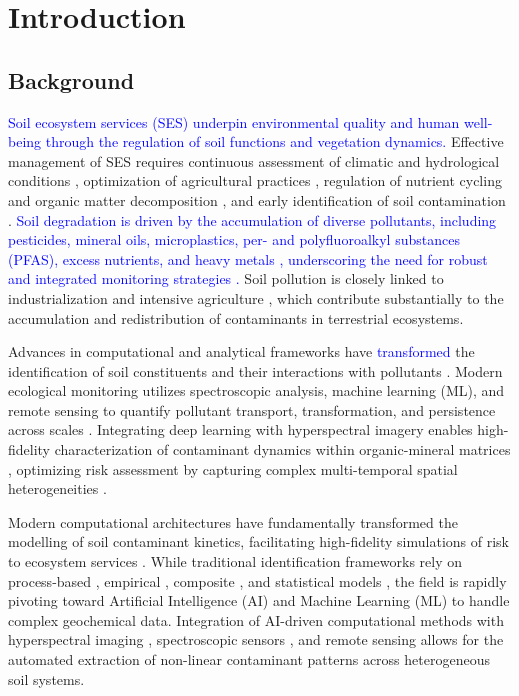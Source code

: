 \documentclass[environments,article,submit,pdftex,moreauthors]{Definitions/mdpi}
\begin{document}
\section{Introduction}\label{sec1}

\subsection{Background}\label{sec1.1}

\textcolor{blue}{Soil ecosystem services (SES) underpin environmental quality and human well-being through the regulation of soil functions and vegetation dynamics.} Effective management of SES requires continuous assessment of climatic and hydrological conditions \cite{Lal2020,Robinson2014}, optimization of agricultural practices \cite{Hepperly2009}, regulation of nutrient cycling and organic matter decomposition \cite{Atoloye2024,Ma2024,Vishwanath2025}, and early identification of soil contamination \cite{Pan2019,Lemenkova2025b,Proshad2025}. \textcolor{blue}{Soil degradation is driven by the accumulation of diverse pollutants, including pesticides, mineral oils, microplastics, per- and polyfluoroalkyl substances (PFAS), excess nutrients, and heavy metals \cite{Shen2024,Guan2024,Baghaie2020,Luo2017}, underscoring the need for robust and integrated monitoring strategies \cite{Liu2020,Lemenkova2025d}.} Soil pollution is closely linked to industrialization \cite{Rosskopfova2012,Guo2025} and intensive agriculture \cite{Hepperly2009}, which contribute substantially to the accumulation and redistribution of contaminants in terrestrial ecosystems.

Advances in computational and analytical frameworks have \textcolor{blue}{transformed} the identification of soil constituents and their interactions with pollutants \cite{Liu2020}. Modern ecological monitoring utilizes spectroscopic analysis, machine learning (ML), and remote sensing to quantify pollutant transport, transformation, and persistence across scales \cite{Padarian}. Integrating deep learning with hyperspectral imagery enables high-fidelity characterization of contaminant dynamics within organic-mineral matrices \cite{Xu2026}, optimizing risk assessment by capturing complex multi-temporal spatial heterogeneities \cite{Proshad2025}.

Modern computational architectures have fundamentally transformed the
modelling of soil contaminant kinetics, facilitating high-fidelity simulations
of risk to ecosystem services
\cite{Liu2020,Proshad2025}. While traditional
identification frameworks rely on process-based
\cite{Giannakis2017}, empirical \cite{Benavidez2018,Lal2020},
composite \cite{Sadhukhan2022}, and statistical models
\cite{Dadi,Lemenkova2024b}, the field is rapidly pivoting toward
Artificial Intelligence (AI) and Machine Learning (ML) to handle complex
geochemical data. Integration of AI-driven computational methods
\cite{Proshad2025} with hyperspectral imaging
\cite{Wei}, spectroscopic sensors \cite{Xu2026,Guo2025}, and
remote sensing \cite{Wang,Lemenkova2025b} allows for the automated
extraction of non-linear contaminant patterns across heterogeneous soil
systems.
\end{document}
